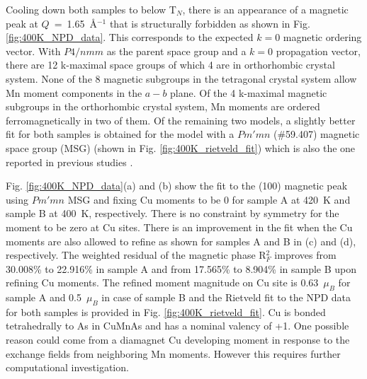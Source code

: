 \documentclass[letterpaper,10pt,doublespacing,edeposit]{uiucthesis2020}
\begin{document}
\begin{mainmatter}
Cooling down both samples to below T$_N$, there is an appearance of a magnetic peak at $Q$~=~1.65~\AA$^{-1}$ that is structurally forbidden as shown in Fig. \ref{fig:400K_NPD_data}. This corresponds to the expected $k = 0$ magnetic ordering vector. With $P4/nmm$ as the parent space group and a $k = 0$ propagation vector, there are 12 k-maximal space groups of which 4 are in orthorhombic crystal system. None of the 8 magnetic subgroups in the tetragonal crystal system allow Mn moment components in the $a-b$ plane. Of the 4 k-maximal magnetic subgroups in the orthorhombic crystal system, Mn moments are ordered ferromagnetically in two of them. Of the remaining two models, a slightly better fit for both samples is obtained for the model with a $Pm'mn$ (\#59.407) magnetic space group (MSG) (shown in Fig. \ref{fig:400K_rietveld_fit}) which is also the one reported in previous studies \cite{Wadley2015}.

Fig. \ref{fig:400K_NPD_data}(a) and (b) show the fit to the (100) magnetic peak using $Pm'mn$ MSG and fixing Cu moments to be 0 for sample A at 420~K and sample B at 400~K, respectively. There is no constraint by symmetry for the moment to be zero at Cu sites. There is an improvement in the fit when the Cu moments are also allowed to refine as shown for samples A and B in (c) and (d), respectively. The weighted residual of the magnetic phase R$_F^2$ improves from 30.008\% to 22.916\% in sample A and from 17.565\% to 8.904\% in sample B upon refining Cu moments. The refined moment magnitude on Cu site is 0.63~$\mu_B$ for sample A and 0.5~$\mu_B$ in case of sample B and the Rietveld fit to the NPD data for both samples is provided in Fig. \ref{fig:400K_rietveld_fit}. 
Cu is bonded tetrahedrally to As in CuMnAs and has a nominal valency of +1. One possible reason could come from a diamagnet Cu developing moment in response to the exchange fields from neighboring Mn moments. However this requires further computational investigation. %




\end{mainmatter}
\end{document}
